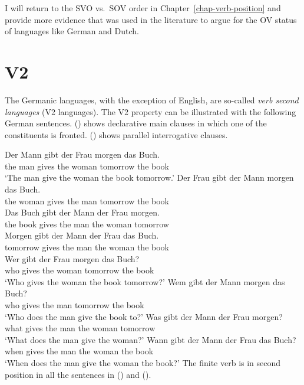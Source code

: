 I will return to the SVO vs.\ SOV order in Chapter~\ref{chap-verb-position} and provide more
evidence that was used in the literature to argue for the OV status of languages like German and Dutch.


\section{V2}
\label{sec-phenomenon-v2}

The Germanic languages, with the exception of English, are so-called \emph{verb second languages} (V2
languages). The V2
property can be illustrated with the following German sentences. () shows declarative main
clauses in which one of the constituents is fronted. () shows parallel interrogative clauses.

\eal
\ex 
\gll Der Mann gibt der Frau morgen das Buch.\\
     the man  gives the woman tomorrow the book\\
\glt `The man give the woman the book tomorrow.'
\ex 
\gll Der Frau gibt der Mann morgen das Buch.\\
     the woman gives the man tomorrow the book\\
\ex 
\gll Das Buch gibt der Mann der Frau morgen.\\
     the book gives the man the woman tomorrow\\
\ex 
\gll Morgen gibt der Mann der Frau das Buch.\\
     tomorrow gives the man the woman the book\\
\zl
\eal
\ex 
\gll Wer gibt der Frau morgen das Buch?\\  
     who gives the woman tomorrow the book\\
\glt `Who gives the woman the book tomorrow?'
\ex 
\gll Wem gibt der Mann morgen das Buch?\\
     who gives the man tomorrow the book\\
\glt `Who does the man give the book to?'
\ex 
\gll Was gibt der Mann der Frau morgen?\\
     what gives the man the woman tomorrow\\
\glt `What does the man give the woman?'
\ex 
\gll Wann gibt der Mann der Frau das Buch?\\
     when gives the man the woman the book\\
\glt `When does the man give the woman the book?'
\zl
The finite verb is in second position in all the sentences in () and ().


